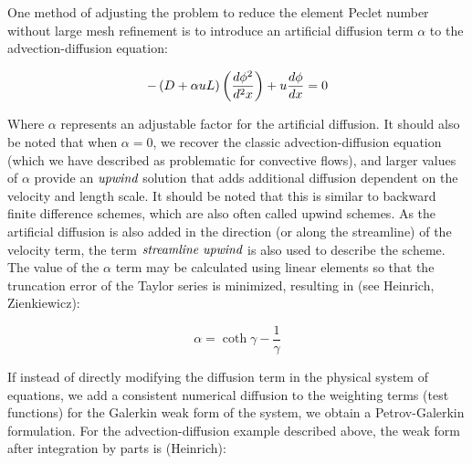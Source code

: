 One method of adjusting the problem to reduce the element Peclet number without large mesh refinement is to introduce an artificial diffusion term $\alpha$ to the advection-diffusion equation:

\begin{equation}
  -\left( D+{\alpha}uL \right)\left( \frac{d\phi^2}{d^2x} \right)+u\frac{d\phi}{dx}=0
  \label{eqn:directupwind}
\end{equation}

Where $\alpha$ represents an adjustable factor for the artificial diffusion. It should also be noted that when $\alpha=0$, we recover the classic advection-diffusion equation (which we have described as problematic for convective flows), and larger values of $\alpha$ provide an $\emph{upwind}$ solution that adds additional diffusion dependent on the velocity and length scale. It should be noted that this is similar to backward finite difference schemes, which are also often called upwind schemes. As the artificial diffusion is also added in the direction (or along the streamline) of the velocity term, the term $\emph{streamline upwind}$ is also used to describe the scheme. The value of the $\alpha$ term may be calculated using linear elements so that the truncation error of the Taylor series is minimized, resulting in (see Heinrich, Zienkiewicz):

\begin{equation}
  \alpha= {\coth{\gamma} - \frac{1}{\gamma}}
\end{equation}

If instead of directly modifying the diffusion term in the physical system of equations, we add a consistent numerical diffusion to the weighting terms (test functions) for the Galerkin weak form of the system, we obtain a Petrov-Galerkin formulation. For the advection-diffusion example described above, the weak form after integration by parts is (Heinrich):

